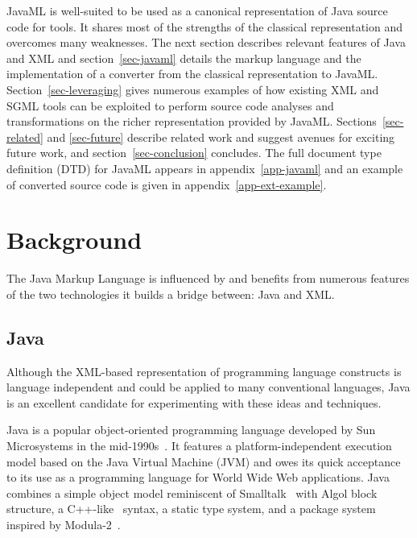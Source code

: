 \documentclass{article}
\begin{document}
JavaML is well-suited to be used as a canonical representation of Java
source code for tools.  It shares most of the strengths of the classical
representation and overcomes
many weaknesses.  The next section describes
relevant features of Java and XML and section~\ref{sec-javaml}
 details the markup language and the implementation of a
converter from the classical representation to JavaML.  Section~\ref{sec-leveraging}
gives numerous examples of how existing XML and SGML tools can be
exploited to perform source code analyses and transformations on the
richer representation provided by JavaML.  Sections~\ref{sec-related}
and \ref{sec-future} describe related work and suggest avenues for
exciting future work, and section~\ref{sec-conclusion} concludes.
The full document type definition (DTD) for JavaML appears in
appendix~\ref{app-javaml} and an example of converted source code
is given in appendix~\ref{app-ext-example}.

\section{Background}
\label{sec-background}

The Java Markup Language is influenced by and benefits from numerous 
features of the two technologies it builds a bridge between: Java and XML.

\subsection{Java}
\label{ssec-java}

    Although the XML-based representation of programming language
    constructs is language independent and could be applied to many
    conventional languages, Java is an excellent candidate for 
    experimenting with these ideas and techniques.

    Java is a popular object-oriented programming language developed by
    Sun Microsystems in the mid-1990s~\cite{Java,JavaNutShell}.
    It features a
    platform-independent execution model based on the Java Virtual
    Machine (JVM) and owes its quick acceptance to its use as a
    programming language for World Wide Web applications.  Java combines
    a simple object model reminiscent of Smalltalk~\cite{Smalltalk}
    with Algol block
    structure, a C++-like~\cite{C++} syntax, a static type system, and a package
    system inspired by Modula-2~\cite{Modula2}.
\end{document}
